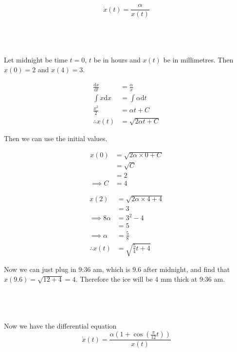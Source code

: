 \documentclass[a4paper]{article}
\begin{document}
\subsection{~}

$$\dot x(t) = \frac{\alpha}{x(t)}$$

\subsection{~}

Let midnight be time $t = 0$, $t$ be in hours and $x(t)$ be in millimetres. Then $x(0) = 2$ and $x(4) = 3$.

\begin{align*}
	\frac{\mathrm d x}{\mathrm d t} &= \frac{\alpha}{x}\\
	\int x \mathrm d x              &= \int \alpha \mathrm d t\\
	\frac{x^2}{2}                   &= \alpha t + C\\
	\therefore x(t)                 &= \sqrt{2\alpha t + C}
\end{align*}

Then we can use the initial values.

\begin{align*}
	x(0) &= \sqrt{2 \alpha \times 0 + C}\\
		 &= \sqrt C\\
		 &= 2\\
	\implies C &= 4
\end{align*}

\begin{align*}
	x(2) &= \sqrt{2 \alpha \times 4 + 4}\\
		 &= 3\\
	\implies 8 \alpha &= 3^2 - 4\\
					  &= 5\\
	\implies \alpha &= \frac58\\
	\therefore x(t) &= \sqrt{\frac54 t + 4}
\end{align*}

Now we can just plug in 9:36 am, which is $9.6$ after midnight, and find that $x(9.6) = \sqrt{12 + 4} = 4$. Therefore the ice will be 4 mm thick at 9:36 am.

\subsection{~}

Now we have the differential equation $$\dot x(t) = \frac{\alpha \left(1 + \cos\left( \frac{\pi}{12} t \right)\right)}{x(t)}$$
\end{document}
